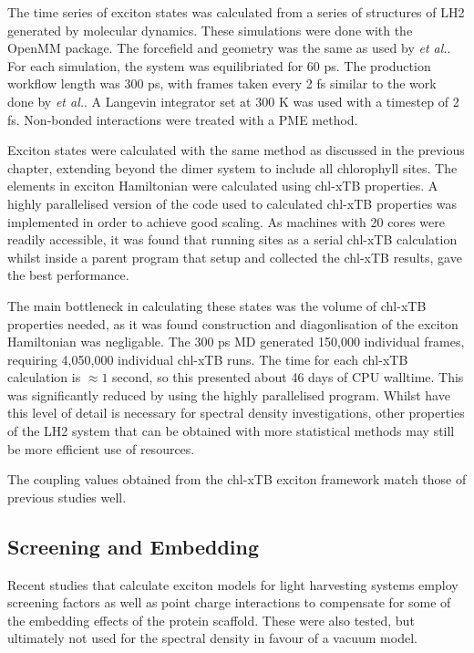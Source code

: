 The time series of exciton states was calculated from a series of structures of 
LH2 generated by molecular dynamics. These simulations were done with the OpenMM 
package. The forcefield and geometry was the same as used by \emph{et al.}. For 
each simulation, the system was equilibriated for 60 ps. The production workflow 
length was 300 ps, with frames taken every 2 fs similar to the work done by \emph{et al.}.
A Langevin integrator set at 300 K was used with a timestep of 2 fs. Non-bonded
interactions were treated with a PME method.

Exciton states were calculated with the same method as discussed in the previous 
chapter, extending beyond the dimer system to include all chlorophyll sites. The
elements in exciton Hamiltonian were calculated using chl-xTB properties. A highly
parallelised version of the code used to calculated chl-xTB properties was implemented
in order to achieve good scaling. As machines with 20 cores were readily accessible, 
it was found that running sites as a serial chl-xTB calculation whilst inside a 
parent program that setup and collected the chl-xTB results, gave the best performance.

The main bottleneck in calculating these states was the volume of chl-xTB properties
needed, as it was found construction and diagonlisation of the exciton Hamiltonian
was negligable. The 300 ps MD generated 150,000 individual frames, requiring 4,050,000
individual chl-xTB runs. The time for each chl-xTB calculation is $\approx 1$ second,
so this presented about 46 days of CPU walltime. This was significantly reduced 
by using the highly parallelised program. Whilst have this level of detail is necessary
for spectral density investigations, other properties of the LH2 system that can
be obtained with more statistical methods may still be more efficient use of resources.

The coupling values obtained from the chl-xTB exciton framework match those of previous
studies well.

\subsection{Screening and Embedding}
\label{subsec:screening}

Recent studies that calculate exciton models for light harvesting systems employ
screening factors as well as point charge interactions to compensate for some of
the embedding effects of the protein scaffold. These were also tested, but ultimately
not used for the spectral density in favour of a vacuum model.

